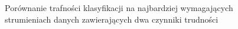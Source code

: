 \begin{figure}[h]
    \centering
    \qquad
    \caption{Porównanie trafności klasyfikacji na najbardziej wymagających strumieniach danych zawierających dwa czynniki trudności}\label{Figure:PairsComparisonHNOB}
\end{figure}

